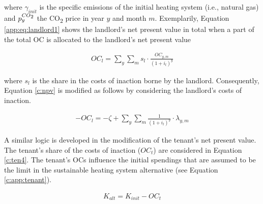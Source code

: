 \documentclass[review]{elsarticle}
\begin{document}
where $\gamma_{init}$ is the specific emissions of the initial heating system (i.e., natural gas) and $p_{y}^{CO\textsubscript{2}}$ the CO\textsubscript{2} price in year $y$ and month $m$. Exemplarily, Equation \ref{app:eq:landlord1} shows the landlord's net present value in total when a part of the total OC is allocated to the landlord's net present value

\begin{align}\label{app:eq:landlord1}
	OC_{l} =  \sum_{y} \sum_{m} s_l \cdot \frac{OC_{y,m}}{(1+i_l)^y} 
\end{align}

where $s_l$ is the share in the costs of inaction borne by the landlord. Consequently, Equation \ref{c:npv} is modified as follows by considering the landlord's costs of inaction.

\begin{align}\label{app:eq:landlord}
	-OC_{l} =  -\zeta + \sum_{y} \sum_{m} \frac{1}{(1+i_l)^y} \cdot \lambda_{y,m}
\end{align}

A similar logic is developed in the modification of the tenant's net present value. The tenant's share of the costs of inaction ($OC_{t}$) are considered in Equation \ref{c:ten4}. The tenant's OCs influence the initial spendings that are assumed to be the limit in the sustainable heating system alternative (see Equation \ref{c:app:tenant}).

\begin{align}\label{c:app:tenant}
	K_{alt} = K_{init} - OC_{t}
\end{align}
\end{document}
